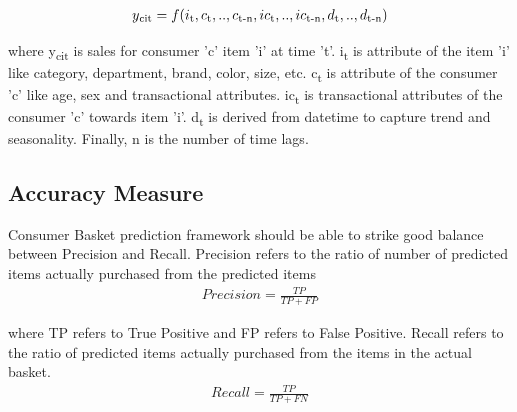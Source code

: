   \begin{equation}
    \begin{array}{l}
      y\textsubscript{cit}  = f(i\textsubscript{t}, c\textsubscript{t},..,c\textsubscript{t-n}, ic\textsubscript{t}
      ,..,ic\textsubscript{t-n}, d\textsubscript{t},..,d\textsubscript{t-n})
    \end{array}
    \label{eqn:fx}
  \end{equation}

where y\textsubscript{cit} is sales for consumer 'c' item ’i’ at time ’t’. 
i\textsubscript{t} is attribute of the item ’i’ like category, department, brand, color, size, etc. 
c\textsubscript{t} is attribute of the consumer 'c' like age, sex and transactional attributes. 
ic\textsubscript{t} is transactional attributes of the consumer 'c'  towards item 'i'. 
d\textsubscript{t} is derived from datetime to capture trend and seasonality. 
Finally, n is the number of time lags.


\subsection{Accuracy Measure}
Consumer Basket prediction framework should be able to strike good balance between Precision and Recall. 
Precision refers to the ratio of number of predicted items actually purchased from the predicted items
  \begin{equation}
      \begin{array}{l}
        Precision = \frac{TP} {TP + FP}
      \end{array}
    \label{eqn:Precision}
  \end{equation}

where TP refers to True Positive and FP refers to False Positive.
Recall refers to the ratio of predicted items actually purchased from the items in the actual basket. 
  \begin{equation}
      \begin{array}{l}
        Recall = \frac{TP} {TP + FN}
        \end{array}
    \label{eqn:Recall}
  \end{equation}

